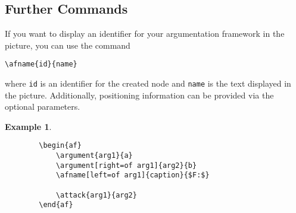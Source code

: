 \documentclass{article}
\newtheorem{example}{Example}
\begin{document}
\subsection{Further Commands}
    If you want to display an identifier for your argumentation framework in the picture, you can use the command

    \verb|\afname{id}{name}|

    \noindent
    where \verb|id| is an identifier for the created node and \verb|name| is the text displayed in the picture.
    Additionally, positioning information can be provided via the optional parameters.

    \begin{example}~
    \begin{verbatim}
        \begin{af}
            \argument{arg1}{a}
            \argument[right=of arg1]{arg2}{b}
            \afname[left=of arg1]{caption}{$F:$}
    
            \attack{arg1}{arg2}
        \end{af}    
    \end{verbatim}

    \begin{center}
        \begin{af}
    
        \end{af}    
    \end{center}
    \end{example}
\end{document}

